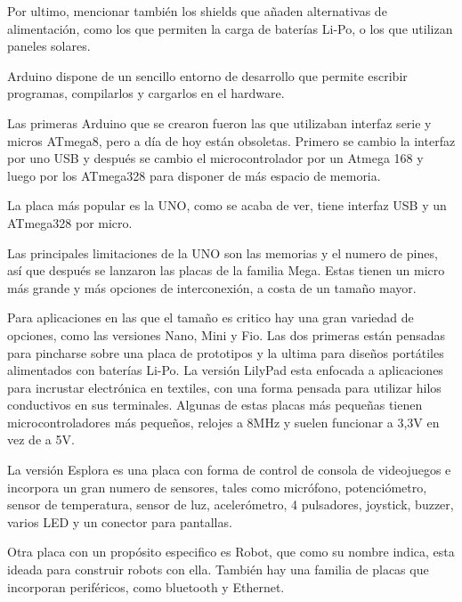 Por ultimo, mencionar también los shields que añaden alternativas de alimentación, como los que permiten la carga de baterías Li-Po, o los que utilizan paneles solares.



Arduino dispone de un sencillo entorno de desarrollo que permite escribir programas, compilarlos y cargarlos en el hardware. 



Las primeras Arduino que se crearon fueron las que utilizaban interfaz serie y micros ATmega8, pero a día de hoy están obsoletas. Primero se cambio la interfaz por uno USB y después se cambio el microcontrolador por un Atmega 168 y luego por los ATmega328 para disponer de más espacio de memoria.



La placa más popular es la UNO, como se acaba de ver, tiene interfaz USB y un ATmega328 por micro.



Las principales limitaciones de la UNO son las memorias y el numero de pines, así que después se lanzaron las placas de la familia Mega. Estas tienen un micro más grande y más opciones de interconexión, a costa de un tamaño mayor.



Para aplicaciones en las que el tamaño es critico hay una gran variedad de opciones, como las versiones Nano, Mini y Fio. Las dos primeras están pensadas para pincharse sobre una placa de prototipos y la ultima para diseños portátiles alimentados con baterías Li-Po. La versión LilyPad esta enfocada a aplicaciones para incrustar electrónica en textiles, con una forma pensada para utilizar hilos conductivos en sus terminales. Algunas de estas placas más pequeñas tienen microcontroladores más pequeños, relojes a 8MHz y suelen funcionar a 3,3V en vez de a 5V.



La versión Esplora es una placa con forma de control de consola de videojuegos e incorpora un gran numero de sensores, tales como micrófono, potenciómetro, sensor de temperatura, sensor de luz, acelerómetro, 4 pulsadores, joystick, buzzer, varios LED y un conector para pantallas.



Otra placa con un propósito especifico es Robot, que como su nombre indica, esta ideada para construir robots con ella. También hay una familia de placas que incorporan periféricos, como bluetooth y Ethernet.



